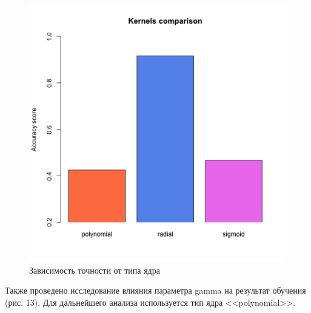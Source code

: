 \documentclass[]{article}
\numberwithin{equation}{section}
\begin{document}
        \begin{figure}[H]
            \centering
            \includegraphics[width = 0.7\linewidth]{data/data5_compare_hist.png}
            \caption{Зависимость точности от типа ядра}
        \end{figure}

        Также проведено исследование влияния параметра gamma на результат обучения (рис. 13). Для дальнейшего анализа используется тип ядра  <<polynomial>>.
\end{document}
